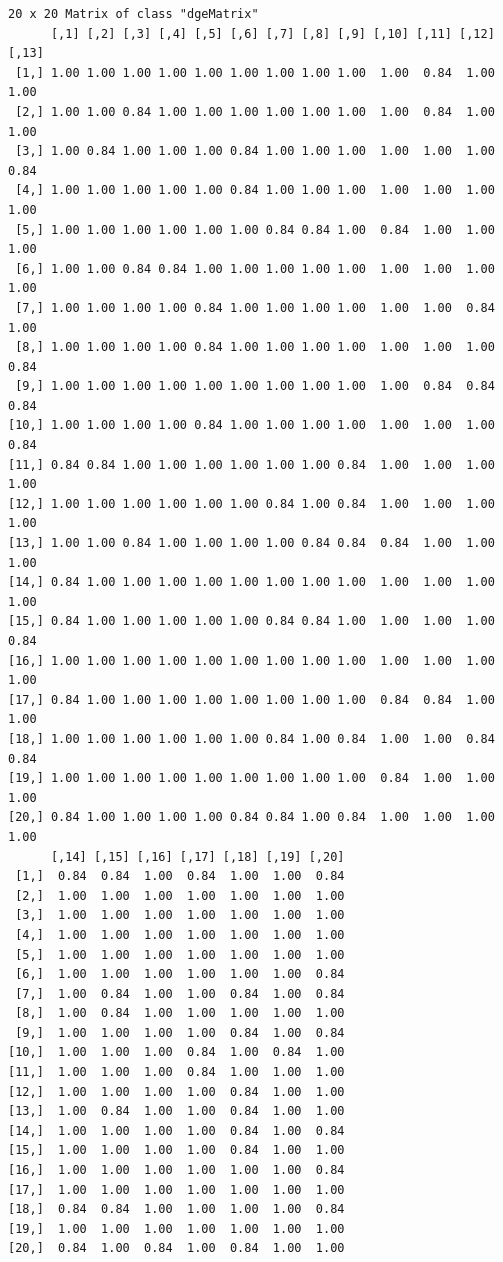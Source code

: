 \documentclass[11pt]{article}
\begin{document}
\begin{enumerate}
\begin{verbatim}
20 x 20 Matrix of class "dgeMatrix"
      [,1] [,2] [,3] [,4] [,5] [,6] [,7] [,8] [,9] [,10] [,11] [,12] [,13]
 [1,] 1.00 1.00 1.00 1.00 1.00 1.00 1.00 1.00 1.00  1.00  0.84  1.00  1.00
 [2,] 1.00 1.00 0.84 1.00 1.00 1.00 1.00 1.00 1.00  1.00  0.84  1.00  1.00
 [3,] 1.00 0.84 1.00 1.00 1.00 0.84 1.00 1.00 1.00  1.00  1.00  1.00  0.84
 [4,] 1.00 1.00 1.00 1.00 1.00 0.84 1.00 1.00 1.00  1.00  1.00  1.00  1.00
 [5,] 1.00 1.00 1.00 1.00 1.00 1.00 0.84 0.84 1.00  0.84  1.00  1.00  1.00
 [6,] 1.00 1.00 0.84 0.84 1.00 1.00 1.00 1.00 1.00  1.00  1.00  1.00  1.00
 [7,] 1.00 1.00 1.00 1.00 0.84 1.00 1.00 1.00 1.00  1.00  1.00  0.84  1.00
 [8,] 1.00 1.00 1.00 1.00 0.84 1.00 1.00 1.00 1.00  1.00  1.00  1.00  0.84
 [9,] 1.00 1.00 1.00 1.00 1.00 1.00 1.00 1.00 1.00  1.00  0.84  0.84  0.84
[10,] 1.00 1.00 1.00 1.00 0.84 1.00 1.00 1.00 1.00  1.00  1.00  1.00  0.84
[11,] 0.84 0.84 1.00 1.00 1.00 1.00 1.00 1.00 0.84  1.00  1.00  1.00  1.00
[12,] 1.00 1.00 1.00 1.00 1.00 1.00 0.84 1.00 0.84  1.00  1.00  1.00  1.00
[13,] 1.00 1.00 0.84 1.00 1.00 1.00 1.00 0.84 0.84  0.84  1.00  1.00  1.00
[14,] 0.84 1.00 1.00 1.00 1.00 1.00 1.00 1.00 1.00  1.00  1.00  1.00  1.00
[15,] 0.84 1.00 1.00 1.00 1.00 1.00 0.84 0.84 1.00  1.00  1.00  1.00  0.84
[16,] 1.00 1.00 1.00 1.00 1.00 1.00 1.00 1.00 1.00  1.00  1.00  1.00  1.00
[17,] 0.84 1.00 1.00 1.00 1.00 1.00 1.00 1.00 1.00  0.84  0.84  1.00  1.00
[18,] 1.00 1.00 1.00 1.00 1.00 1.00 0.84 1.00 0.84  1.00  1.00  0.84  0.84
[19,] 1.00 1.00 1.00 1.00 1.00 1.00 1.00 1.00 1.00  0.84  1.00  1.00  1.00
[20,] 0.84 1.00 1.00 1.00 1.00 0.84 0.84 1.00 0.84  1.00  1.00  1.00  1.00
      [,14] [,15] [,16] [,17] [,18] [,19] [,20]
 [1,]  0.84  0.84  1.00  0.84  1.00  1.00  0.84
 [2,]  1.00  1.00  1.00  1.00  1.00  1.00  1.00
 [3,]  1.00  1.00  1.00  1.00  1.00  1.00  1.00
 [4,]  1.00  1.00  1.00  1.00  1.00  1.00  1.00
 [5,]  1.00  1.00  1.00  1.00  1.00  1.00  1.00
 [6,]  1.00  1.00  1.00  1.00  1.00  1.00  0.84
 [7,]  1.00  0.84  1.00  1.00  0.84  1.00  0.84
 [8,]  1.00  0.84  1.00  1.00  1.00  1.00  1.00
 [9,]  1.00  1.00  1.00  1.00  0.84  1.00  0.84
[10,]  1.00  1.00  1.00  0.84  1.00  0.84  1.00
[11,]  1.00  1.00  1.00  0.84  1.00  1.00  1.00
[12,]  1.00  1.00  1.00  1.00  0.84  1.00  1.00
[13,]  1.00  0.84  1.00  1.00  0.84  1.00  1.00
[14,]  1.00  1.00  1.00  1.00  0.84  1.00  0.84
[15,]  1.00  1.00  1.00  1.00  0.84  1.00  1.00
[16,]  1.00  1.00  1.00  1.00  1.00  1.00  0.84
[17,]  1.00  1.00  1.00  1.00  1.00  1.00  1.00
[18,]  0.84  0.84  1.00  1.00  1.00  1.00  0.84
[19,]  1.00  1.00  1.00  1.00  1.00  1.00  1.00
[20,]  0.84  1.00  0.84  1.00  0.84  1.00  1.00
\end{verbatim}



\end{enumerate}
\end{document}
